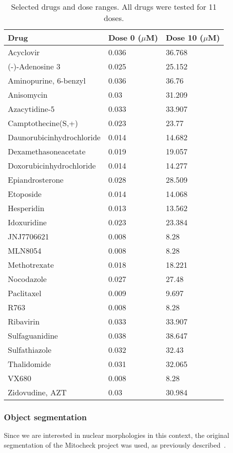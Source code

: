 \begin{table}[!ht]
\centering
\caption{Selected drugs and dose ranges. All drugs were tested for 11 doses.}
\label{drug_dose}
\begin{tabular}{|l|l|l|}
\hline
Drug& Dose 0 ($\mu$M) & Dose 10 ($\mu$M)\\
\hline
Acyclovir  & 0.036 & 36.768\\
(-)-Adenosine 3  & 0.025 & 25.152\\
Aminopurine, 6-benzyl  & 0.036 & 36.76\\
Anisomycin  & 0.03 & 31.209\\
Azacytidine-5  & 0.033 & 33.907\\
Camptothecine(S,+)  & 0.023 & 23.77\\
Daunorubicinhydrochloride  & 0.014 & 14.682\\
Dexamethasoneacetate  & 0.019 & 19.057\\
Doxorubicinhydrochloride  & 0.014 & 14.277\\
Epiandrosterone  & 0.028 & 28.509\\
Etoposide  & 0.014 & 14.068\\
Hesperidin  & 0.013 & 13.562\\
Idoxuridine  & 0.023 & 23.384\\
JNJ7706621  & 0.008 & 8.28\\
MLN8054  & 0.008 & 8.28\\
Methotrexate  & 0.018 & 18.221\\
Nocodazole  & 0.027 & 27.48\\
Paclitaxel  & 0.009 & 9.697\\
R763  & 0.008 & 8.28\\
Ribavirin  & 0.033 & 33.907\\
Sulfaguanidine  & 0.038 & 38.647\\
Sulfathiazole  & 0.032 & 32.43\\
Thalidomide  & 0.031 & 32.065\\
VX680  & 0.008 & 8.28\\
Zidovudine, AZT  & 0.03 & 30.984\\
\hline
\end{tabular}
\end{table}

\subsubsection{Object segmentation}
\label{sec:ds_seg}
Since we are interested in nuclear morphologies in this context, the original segmentation of the Mitocheck project was used, as previously described~\cite{Walter2010}.

